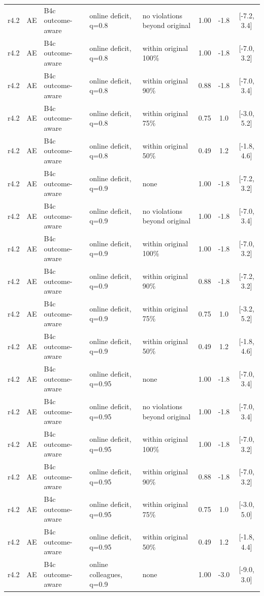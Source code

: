 \begin{longtable}{lllp{4.2cm}p{3.4cm}ccc}
r4.2 & AE & B4c outcome-aware & online deficit, q=0.8 & no violations beyond original & 1.00 & -1.8 & [-7.2, 3.4] \\
r4.2 & AE & B4c outcome-aware & online deficit, q=0.8 & within original 100\% & 1.00 & -1.8 & [-7.0, 3.2] \\
r4.2 & AE & B4c outcome-aware & online deficit, q=0.8 & within original 90\% & 0.88 & -1.8 & [-7.0, 3.4] \\
r4.2 & AE & B4c outcome-aware & online deficit, q=0.8 & within original 75\% & 0.75 & 1.0 & [-3.0, 5.2] \\
r4.2 & AE & B4c outcome-aware & online deficit, q=0.8 & within original 50\% & 0.49 & 1.2 & [-1.8, 4.6] \\
r4.2 & AE & B4c outcome-aware & online deficit, q=0.9 & none & 1.00 & -1.8 & [-7.2, 3.2] \\
r4.2 & AE & B4c outcome-aware & online deficit, q=0.9 & no violations beyond original & 1.00 & -1.8 & [-7.0, 3.4] \\
r4.2 & AE & B4c outcome-aware & online deficit, q=0.9 & within original 100\% & 1.00 & -1.8 & [-7.0, 3.2] \\
r4.2 & AE & B4c outcome-aware & online deficit, q=0.9 & within original 90\% & 0.88 & -1.8 & [-7.2, 3.2] \\
r4.2 & AE & B4c outcome-aware & online deficit, q=0.9 & within original 75\% & 0.75 & 1.0 & [-3.2, 5.2] \\
r4.2 & AE & B4c outcome-aware & online deficit, q=0.9 & within original 50\% & 0.49 & 1.2 & [-1.8, 4.6] \\
r4.2 & AE & B4c outcome-aware & online deficit, q=0.95 & none & 1.00 & -1.8 & [-7.0, 3.4] \\
r4.2 & AE & B4c outcome-aware & online deficit, q=0.95 & no violations beyond original & 1.00 & -1.8 & [-7.0, 3.4] \\
r4.2 & AE & B4c outcome-aware & online deficit, q=0.95 & within original 100\% & 1.00 & -1.8 & [-7.0, 3.2] \\
r4.2 & AE & B4c outcome-aware & online deficit, q=0.95 & within original 90\% & 0.88 & -1.8 & [-7.0, 3.2] \\
r4.2 & AE & B4c outcome-aware & online deficit, q=0.95 & within original 75\% & 0.75 & 1.0 & [-3.0, 5.0] \\
r4.2 & AE & B4c outcome-aware & online deficit, q=0.95 & within original 50\% & 0.49 & 1.2 & [-1.8, 4.4] \\
r4.2 & AE & B4c outcome-aware & online colleagues, q=0.9 & none & 1.00 & -3.0 & [-9.0, 3.0] \\

\end{longtable}

